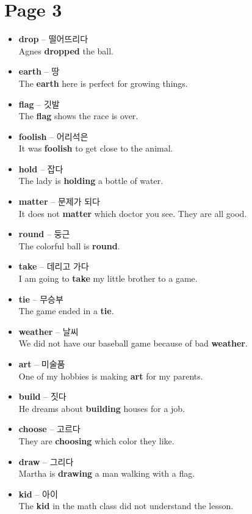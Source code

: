 \documentclass[12pt]{article}
\begin{document}
\newpage
\section*{Page 3}
\begin{itemize}
    \item \textbf{drop} -- 떨어뜨리다 \\
    Agnes \textbf{dropped} the ball.
    \item \textbf{earth} -- 땅 \\
    The \textbf{earth} here is perfect for growing things.
    \item \textbf{flag} -- 깃발 \\
    The \textbf{flag} shows the race is over.
    \item \textbf{foolish} -- 어리석은 \\
    It was \textbf{foolish} to get close to the animal.
    \item \textbf{hold} -- 잡다 \\
    The lady is \textbf{holding} a bottle of water.
    \item \textbf{matter} -- 문제가 되다 \\
    It does not \textbf{matter} which doctor you see. They are all good.
    \item \textbf{round} -- 둥근 \\
    The colorful ball is \textbf{round}.
    \item \textbf{take} -- 데리고 가다 \\
    I am going to \textbf{take} my little brother to a game.
    \item \textbf{tie} -- 무승부 \\
    The game ended in a \textbf{tie}.
    \item \textbf{weather} -- 날씨 \\
    We did not have our baseball game because of bad \textbf{weather}.
    \item \textbf{art} -- 미술품 \\
    One of my hobbies is making \textbf{art} for my parents.
    \item \textbf{build} -- 짓다 \\
    He dreams about \textbf{building} houses for a job.
    \item \textbf{choose} -- 고르다 \\
    They are \textbf{choosing} which color they like.
    \item \textbf{draw} -- 그리다 \\
    Martha is \textbf{drawing} a man walking with a flag.
    \item \textbf{kid} -- 아이 \\
    The \textbf{kid} in the math class did not understand the lesson.
\end{itemize}
\end{document}
